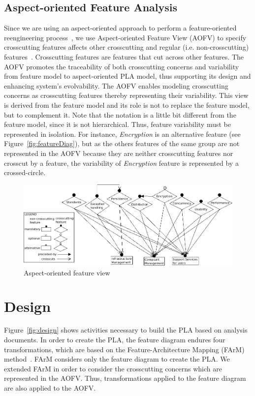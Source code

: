 \documentclass[11pt,twoside]{article}
\begin{document}
\subsection{Aspect-oriented Feature Analysis}
\label{sec:aofv}
Since we are using an aspect-oriented approach to perform a feature-oriented reengineering process~\cite{Kang:2006:FOR}, we use
Aspect-oriented Feature View (AOFV) to specify crosscutting features affects other crosscutting and regular (i.e. non-crosscutting)
features~\cite{Tizzei:2010:AOF}. Crosscutting features are features that cut across other features. The AOFV promotes the traceability
of both crosscutting concerns and variability from feature model to aspect-oriented PLA model, thus supporting its design and enhancing
system's evolvability. The AOFV enables modeling crosscutting concerns as crosscutting features thereby representing their variability. This
view is derived from the feature model and its role is not to replace the feature model, but to complement it. Note that the notation is a
little bit different from the feature model, since it is not hierarchical. Thus, feature variability must be represented in isolation. For
instance, \textit{Encryption} is an alternative feature (see Figure~\ref{fig:featureDiag}), but as the others features of the same group are
not represented in the AOFV because they are neither crosscutting features nor crosscut by a feature, the variability of \textit{Encryption}
feature is represented by a crossed-circle.


\begin{figure}[h!t!b!]
   \centering
    \includegraphics[scale=0.4]{figs/aofv.png}
   \caption{Aspect-oriented feature view}
   \label{fig:aofv}
\end{figure}

\section{Design}
\label{sec:design}
Figure~\ref{fig:design} shows activities necessary to build the PLA based on analysis documents. In order to create the PLA, the feature
diagram endures four transformations, which are based on the Feature-Architecture Mapping (FArM) method~\cite{Sochos:2006:FAM}. FArM
considers only the feature diagram to create the PLA. We extended FArM in order to consider the crosscutting concerns which are represented
in the AOFV. Thus, transformations applied to the feature diagram are also applied to the AOFV.  
\end{document}
